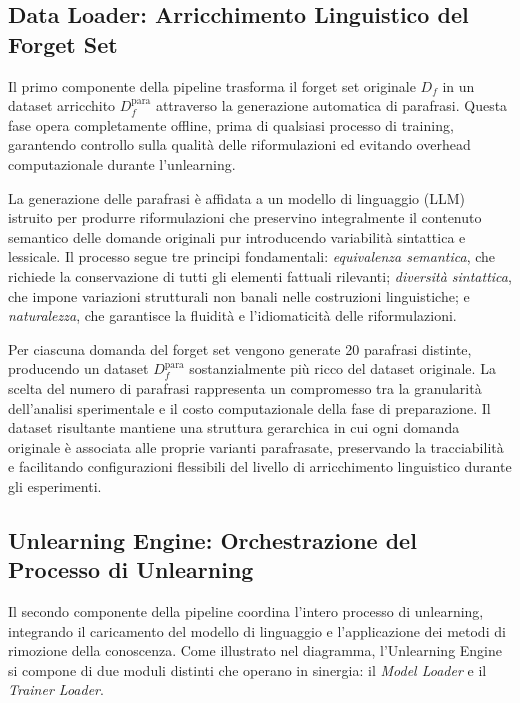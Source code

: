 \subsection{Data Loader: Arricchimento Linguistico del Forget Set}

Il primo componente della pipeline trasforma il forget set originale $D_f$ in un dataset arricchito $D_f^{\text{para}}$ attraverso la generazione automatica di parafrasi. Questa fase opera completamente offline, prima di qualsiasi processo di training, garantendo controllo sulla qualità delle riformulazioni ed evitando overhead computazionale durante l'unlearning.

La generazione delle parafrasi è affidata a un modello di linguaggio (LLM) istruito per produrre riformulazioni che preservino integralmente il contenuto semantico delle domande originali pur introducendo variabilità sintattica e lessicale. Il processo segue tre principi fondamentali: \textit{equivalenza semantica}, che richiede la conservazione di tutti gli elementi fattuali rilevanti; \textit{diversità sintattica}, che impone variazioni strutturali non banali nelle costruzioni linguistiche; e \textit{naturalezza}, che garantisce la fluidità e l'idiomaticità delle riformulazioni.

Per ciascuna domanda del forget set vengono generate 20 parafrasi distinte, producendo un dataset $D_f^{\text{para}}$ sostanzialmente più ricco del dataset originale. La scelta del numero di parafrasi rappresenta un compromesso tra la granularità dell'analisi sperimentale e il costo computazionale della fase di preparazione. Il dataset risultante mantiene una struttura gerarchica in cui ogni domanda originale è associata alle proprie varianti parafrasate, preservando la tracciabilità e facilitando configurazioni flessibili del livello di arricchimento linguistico durante gli esperimenti.

\subsection{Unlearning Engine: Orchestrazione del Processo di Unlearning}

Il secondo componente della pipeline coordina l’intero processo di unlearning, integrando il caricamento del modello di linguaggio e l’applicazione dei metodi di rimozione della conoscenza. Come illustrato nel diagramma, l’Unlearning Engine si compone di due moduli distinti che operano in sinergia: il \textit{Model Loader} e il \textit{Trainer Loader}.

